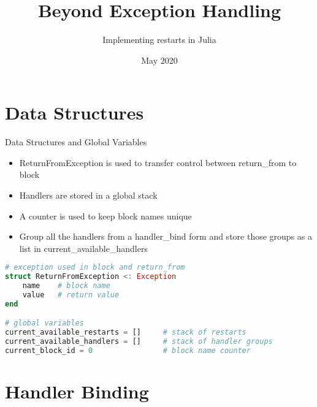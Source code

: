 \documentclass{beamer}
\title[Julia Restarts]{Beyond Exception Handling}
\subtitle{Implementing restarts in Julia}
\author[Alexandre \& Rafael]{%
  \texorpdfstring{%
    \begin{columns}
      \column{.5\linewidth}
      \centering
      Alexandre Faria \\ 97005
      \column{.5\linewidth}
      \centering
      Rafael Pinto \\ 97153
    \end{columns}
 }
 {Alexandre Faria, Rafael Pinto}
}
\institute[IST]{Instituto Superior Técnico}
\date[May 2020]{May 2020}
\begin{document}
\begin{frame}
  \titlepage
\end{frame}



\section{Data Structures}
\begin{frame}[fragile,t]{Data Structures and Global Variables}


\begin{itemize}
  \item ReturnFromException is used to transfer control between return\_from to block
  \item Handlers are stored in a global stack
  \item A counter is used to keep block names unique
  \item Group all the handlers from a handler\_bind form and store those groups as a list in current\_available\_handlers
\end{itemize}

\vfill

\begin{lstlisting}[language=julia, style=jlcodestyle]
# exception used in block and return_from
struct ReturnFromException <: Exception
    name    # block name
    value   # return value
end

# global variables
current_available_restarts = []     # stack of restarts
current_available_handlers = []     # stack of handler groups
current_block_id = 0                # block name counter
\end{lstlisting}
\end{frame}


\section{Handler Binding}
\end{document}
